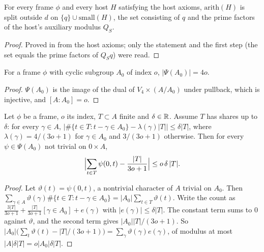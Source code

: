 \begin{lemma}\label{bal:host-split}
For every frame $\phi$ and every host $H$ satisfying the host axioms, $\mathrm{arith}(H)$ is split outside $d$ on $\{q\}\cup\mathrm{small}(H)$, the set consisting of $q$ and the prime factors of the host's auxiliary modulus $Q_S$.
\end{lemma}
\begin{proof}
Proved in  from the host axioms; only the statement and the first step (the set equals the prime factors of $Q_Sq$) were read.
\end{proof}

\begin{lemma}\label{bal:card-psiA}
For a frame $\phi$ with cyclic subgroup $A_0$ of index $o$, $|\Psi(A_0)|=4o$.
\end{lemma}
\begin{proof}
$\Psi(A_0)$ is the image of the dual of $V_4\times(A/A_0)$ under pullback, which is injective, and $[A:A_0]=o$.
\end{proof}

\begin{lemma}\label{bal:tops-sum}
Let $\phi$ be a frame, $o$ its index, $T\subset A$ finite and $\delta\in\mathbb{R}$. Assume $T$ has shares up to $\delta$: for every $\gamma\in A$,
$\bigl|\#\{t\in T:t-\gamma\in A_0\}-\lambda(\gamma)|T|\bigr|\le\delta|T|$, where $\lambda(\gamma)=4/(3o+1)$ for $\gamma\in A_0$ and $3/(3o+1)$ otherwise. Then for every $\psi\in\Psi(A_0)$ not trivial on $0\times A$,
\[\Bigl|\sum_{t\in T}\psi(0,t)-\frac{|T|}{3o+1}\Bigr|\le o\,\delta\,|T|.\]
\end{lemma}
\begin{proof}
Let $\vartheta(t)=\psi(0,t)$, a nontrivial character of $A$ trivial on $A_0$. Then $\sum_{\gamma\in A}\vartheta(\gamma)\#\{t\in T:t-\gamma\in A_0\}=|A_0|\sum_{t\in T}\vartheta(t)$. Write the count as $\frac{3|T|}{3o+1}+\frac{|T|}{3o+1}[\gamma\in A_0]+e(\gamma)$ with $|e(\gamma)|\le\delta|T|$. The constant term sums to $0$ against $\vartheta$, and the second term gives $|A_0||T|/(3o+1)$. So $|A_0|\bigl(\sum_t\vartheta(t)-|T|/(3o+1)\bigr)=\sum_{\gamma}\vartheta(\gamma)e(\gamma)$, of modulus at most $|A|\delta|T|=o|A_0|\delta|T|$.
\end{proof}


